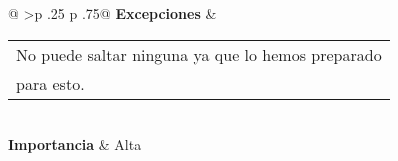 \begin{table}[]
\begin{tabular}{@{}
>{}p {.25\textwidth} p {.75\textwidth}@{}}
\textbf{Excepciones}     & \begin{tabular}[c]{@{}l@{}}No puede saltar ninguna ya que lo hemos preparado\\ para esto.\end{tabular}                                                                                                                                                                                                                                                                                                          \\ \midrule
\textbf{Importancia}     & Alta                                                                                                                                                                                                                                                                                                                                                                                                            \\ \bottomrule
\end{tabular}
\end{table}

